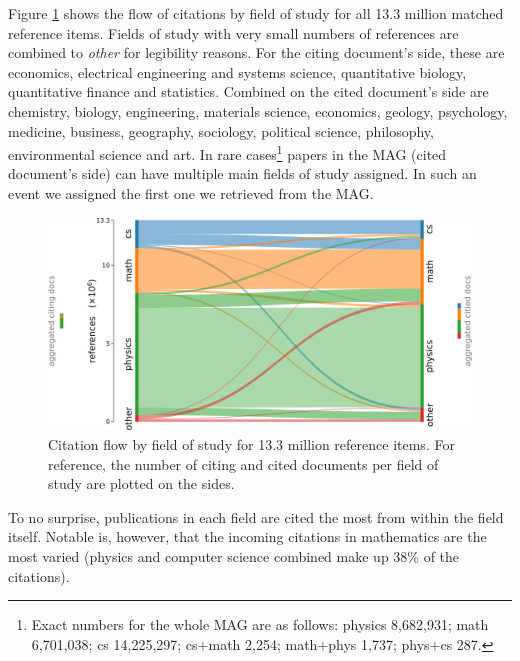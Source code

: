 Figure \ref{fig:sankey} shows the flow of citations by field of study for all 13.3 million matched reference items. Fields of study with very small numbers of references are combined to \emph{other} for legibility reasons. For the citing document's side, these are economics, electrical engineering and systems science, quantitative biology, quantitative finance and statistics. Combined on the cited document's side are chemistry, biology, engineering, materials science, economics, geology, psychology, medicine, business, geography, sociology, political science, philosophy, environmental science and art. In rare cases\footnote{Exact numbers for the whole MAG are as follows: physics 8,682,931; math 6,701,038; cs 14,225,297; cs+math 2,254; math+phys 1,737; phys+cs 287.} papers in the MAG (cited document's side) can have multiple main fields of study assigned. In such an event we assigned the first one we retrieved from the MAG.

\begin{figure}
  \centering
    \includegraphics[width=\textwidth]{figures/dataset/citation_relation_sankey.pdf}
  \caption[Citation flow by field of study for 13.3 million reference items.]{Citation flow by field of study for 13.3 million reference items. For reference, the number of citing and cited documents per field of study are plotted on the sides.}
  \label{fig:sankey}
\end{figure}

To no surprise, publications in each field are cited the most from within the field itself. Notable is, however, that the incoming citations in mathematics are the most varied (physics and computer science combined make up 38\% of the citations).
